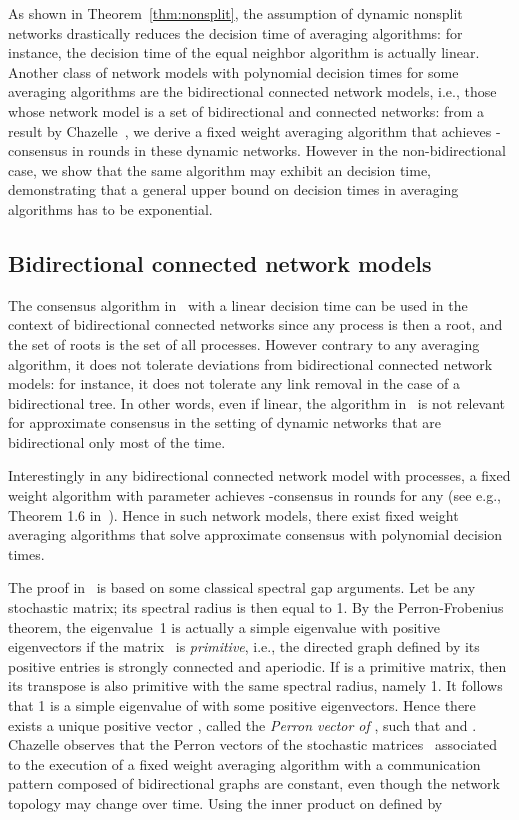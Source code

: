 \documentclass[a4paper]{article}
\theoremstyle{newthm}
\begin{document}
As shown in Theorem~\ref{thm:nonsplit}, the assumption of dynamic
     nonsplit networks drastically reduces the decision time  of
     averaging algorithms: for instance, the decision time of the
     equal neighbor algorithm is actually linear.
Another class of network models with polynomial decision times for
     some averaging algorithms are the bidirectional connected network
     models, i.e., those whose network model is a set of bidirectional
     and connected networks: from a result by Chazelle~\cite{Cha13},
     we derive a fixed weight averaging algorithm that achieves
     -consensus in 
     rounds in these dynamic networks.
However in the non-bidirectional case, we show that the same algorithm
     may exhibit an 
     decision time, demonstrating that a general upper bound on
     decision times in averaging algorithms has to be exponential.
	




\subsection{Bidirectional connected network models}

The consensus algorithm in~\cite{BRS12} with a linear decision time can be used in the context of bidirectional connected 
	networks since any process is then a root, and the set of roots is the set of all processes.
However  contrary to any  averaging algorithm, it does not tolerate
	deviations from bidirectional connected network models: for instance, it does not tolerate any link removal
	in the case of a bidirectional tree.
In other words, even if linear, the algorithm in~\cite{BRS12}  is not relevant for approximate consensus
	in the setting of dynamic networks that are bidirectional only most of the time.

Interestingly in any bidirectional connected network model with 
     processes, a fixed weight algorithm with parameter 
     achieves -consensus in  rounds for any  (see e.g., Theorem 1.6 in~\cite{Cha13}).
Hence in such network models, there exist fixed weight averaging
     algorithms that solve approximate consensus with polynomial
     decision times.
	
The proof in~\cite{Cha13} is based on some classical spectral gap arguments.
Let  be any stochastic matrix; its  spectral radius is then equal to 1.
By the Perron-Frobenius theorem, the eigenvalue~1  is actually a simple 
	eigenvalue with positive eigenvectors if the matrix~ is {\em primitive}, i.e., 
	the directed graph defined by
	its positive entries is strongly connected and aperiodic.
If  is a primitive matrix, then  its transpose  is also  primitive with the same spectral radius, 
	namely 1.
It follows that  1 is a simple eigenvalue of   with some  positive
	eigenvectors.
Hence there exists a unique positive vector , called the {\em Perron vector of} ,
	such that   and  .
Chazelle observes that  the Perron vectors of the stochastic matrices~
	associated to the execution of a fixed weight averaging algorithm with a communication
	pattern composed of bidirectional  graphs
	are constant, even though the network topology may change over time.
Using the inner product on   defined by
	
\end{document}
